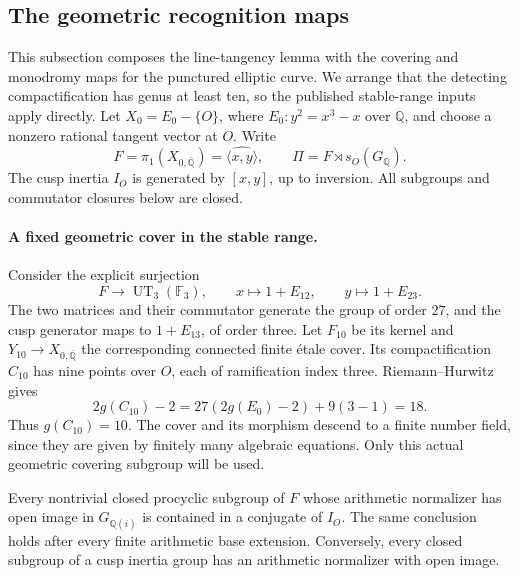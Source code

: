 \subsection{The geometric recognition maps}
\label{subsec:geometric-recognition-maps}

This subsection composes the line-tangency lemma with the
covering and monodromy maps for the punctured elliptic curve.  We arrange that the
detecting compactification has genus at least ten, so the published
stable-range inputs apply directly.
Let \(X_0=E_0-\{O\}\), where \(E_0:y^2=x^3-x\) over \(\mathbb Q\),
and choose a nonzero rational tangent vector at \(O\).
Write
\[
 F=\pi_1(X_{0,\overline{\mathbb Q}})
       =\widehat{\langle x,y\rangle},\qquad
 \Pi=F\rtimes s_O(G_{\mathbb Q}).
\]
The cusp inertia \(I_O\) is generated by \([x,y]\), up to inversion.
All subgroups and commutator closures below are closed.

\paragraph{A fixed geometric cover in the stable range.}
Consider the explicit surjection
\[
 F\longrightarrow \operatorname{UT}_3(\mathbb F_3),\qquad
 x\longmapsto1+E_{12},\qquad y\longmapsto1+E_{23}.
\]
The two matrices and their commutator generate the group of order
\(27\), and the cusp generator maps to \(1+E_{13}\), of order three.
Let \(F_{10}\) be its kernel and \(Y_{10}\to X_{0,\overline{\mathbb Q}}\)
the corresponding connected finite \'etale cover.
Its compactification \(C_{10}\) has nine points over \(O\),
each of ramification index three.  Riemann--Hurwitz gives
\[
 2g(C_{10})-2=27(2g(E_0)-2)+9(3-1)=18.
\]
Thus \(g(C_{10})=10\).
The cover and its morphism descend to a finite number field,
since they are given by finitely many algebraic equations.
Only this actual geometric covering subgroup will be used.

\begin{theorem}\label{thm:geometric-procyclic-recognition}
Every nontrivial closed procyclic subgroup of \(F\) whose
arithmetic normalizer has open image in \(G_{\mathbb Q(i)}\)
is contained in a conjugate of \(I_O\).
The same conclusion holds after every finite arithmetic base
extension.  Conversely, every closed subgroup of a cusp inertia
group has an arithmetic normalizer with open image.
\end{theorem}

